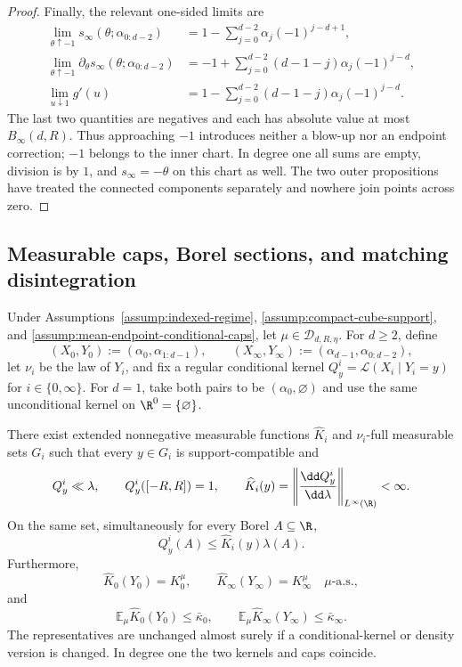 \begin{proof}
Finally, the relevant one-sided limits are
\[
\begin{aligned}
\lim_{\theta\uparrow-1}s_\infty(\theta;\alpha_{0:d-2})
&=1-\sum_{j=0}^{d-2}\alpha_j(-1)^{j-d+1},\\
\lim_{\theta\uparrow-1}\partial_\theta s_\infty(\theta;\alpha_{0:d-2})
&=-1+\sum_{j=0}^{d-2}(d-1-j)\alpha_j(-1)^{j-d},\\
\lim_{u\downarrow1}g'(u)
&=1-\sum_{j=0}^{d-2}(d-1-j)\alpha_j(-1)^{j-d}.
\end{aligned}
\]
The last two quantities are negatives and each has absolute value at most
$B_\infty(d,R)$.  Thus approaching $-1$ introduces neither a blow-up nor an
endpoint correction; $-1$ belongs to the inner chart.  In degree one all
sums are empty, division is by $1$, and $s_\infty=-\theta$ on this chart as
well.  The two outer propositions have treated the connected components
separately and nowhere join points across zero.
\end{proof}

\subsection{Measurable caps, Borel sections, and matching disintegration}
\label{app:disintegration}

\begin{lemma}
\label{lem:kernel-caps}
Under Assumptions~\ref{assump:indexed-regime},
\ref{assump:compact-cube-support}, and
\ref{assump:mean-endpoint-conditional-caps}, let
$\mu\in\mathcal D_{d,R,\eta}$.  For $d\geq2$, define
\[
(X_0,Y_0):=(\alpha_0,\alpha_{1:d-1}),\qquad
(X_\infty,Y_\infty):=(\alpha_{d-1},\alpha_{0:d-2}),
\]
let $\nu_i$ be the law of $Y_i$, and fix a regular conditional kernel
$Q^i_y=\mathcal L(X_i\mid Y_i=y)$ for $i\in\{0,\infty\}$.  For $d=1$,
take both pairs to be $(\alpha_0,\varnothing)$ and use the same unconditional
kernel on $\R^0=\{\varnothing\}$.

There exist extended nonnegative measurable functions $\widehat K_i$ and
$\nu_i$-full measurable sets $G_i$ such that every $y\in G_i$ is
support-compatible and
\[
Q^i_y\ll\lambda,\qquad Q^i_y([-R,R])=1,\qquad
\widehat K_i(y)=\left\|\frac{\dd Q^i_y}{\dd\lambda}\right\|_{L^\infty(\R)}
<\infty.
\]
On the same set, simultaneously for every Borel $A\subseteq\R$,
\begin{equation}
Q^i_y(A)\leq\widehat K_i(y)\lambda(A).
\label{eq:kernel-domination}
\end{equation}
Furthermore,
\begin{equation}
\widehat K_0(Y_0)=K_0^\mu,\qquad
\widehat K_\infty(Y_\infty)=K_\infty^\mu
\quad\mu\text{-a.s.},
\label{eq:cap-identities}
\end{equation}
and
\begin{equation}
\mathbb E_\mu\widehat K_0(Y_0)\leq\bar\kappa_0,
\qquad
\mathbb E_\mu\widehat K_\infty(Y_\infty)\leq\bar\kappa_\infty.
\label{eq:mean-cap-bounds}
\end{equation}
The representatives are unchanged almost surely if a conditional-kernel or
density version is changed.  In degree one the two kernels and caps coincide.
\end{lemma}

